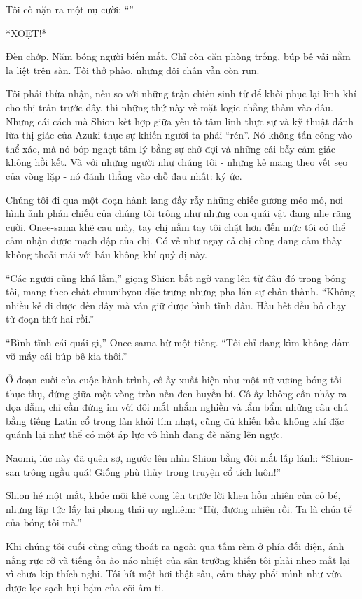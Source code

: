 \documentclass[../main.tex]{subfiles}
\begin{document}
Tôi cố nặn ra một nụ cười: ``''

*XOẸT!*

Đèn chớp. Năm bóng người biến mất. Chỉ còn căn phòng trống, búp bê vải nằm la liệt trên sàn. Tôi thở phào, nhưng đôi chân vẫn còn run.

Tôi phải thừa nhận, nếu so với những trận chiến sinh tử để khôi phục lại linh khí cho thị trấn trước đây, thì những thứ này về mặt logic chẳng thấm vào đâu. Nhưng cái cách mà Shion kết hợp giữa yếu tố tâm linh thực sự và kỹ thuật đánh lừa thị giác của Azuki thực sự khiến người ta phải ``rén''. Nó không tấn công vào thể xác, mà nó bóp nghẹt tâm lý bằng sự chờ đợi và những cái bẫy cảm giác không hồi kết. Và với những người như chúng tôi - những kẻ mang theo vết sẹo của vòng lặp - nó đánh thẳng vào chỗ đau nhất: ký ức.

Chúng tôi đi qua một đoạn hành lang đầy rẫy những chiếc gương méo mó, nơi hình ảnh phản chiếu của chúng tôi trông như những con quái vật đang nhe răng cười. Onee-sama khẽ cau mày, tay chị nắm tay tôi chặt hơn đến mức tôi có thể cảm nhận được mạch đập của chị. Có vẻ như ngay cả chị cũng đang cảm thấy không thoải mái với bầu không khí quỷ dị này.

``Các ngươi cũng khá lắm,'' giọng Shion bất ngờ vang lên từ đâu đó trong bóng tối, mang theo chất chuunibyou đặc trưng nhưng pha lẫn sự chân thành. ``Không nhiều kẻ đi được đến đây mà vẫn giữ được bình tĩnh đâu. Hầu hết đều bỏ chạy từ đoạn thứ hai rồi.''

``Bình tĩnh cái quái gì,'' Onee-sama hừ một tiếng. ``Tôi chỉ đang kìm không đấm vỡ mấy cái búp bê kia thôi.''

Ở đoạn cuối của cuộc hành trình, cô ấy xuất hiện như một nữ vương bóng tối thực thụ, đứng giữa một vòng tròn nến đen huyền bí. Cô ấy không cần nhảy ra dọa dẫm, chỉ cần đứng im với đôi mắt nhắm nghiền và lẩm bẩm những câu chú bằng tiếng Latin cổ trong làn khói tím nhạt, cũng đủ khiến bầu không khí đặc quánh lại như thể có một áp lực vô hình đang đè nặng lên ngực.

Naomi, lúc này đã quên sợ, ngước lên nhìn Shion bằng đôi mắt lấp lánh: ``Shion-san trông ngầu quá! Giống phù thủy trong truyện cổ tích luôn!''

Shion hé một mắt, khóe môi khẽ cong lên trước lời khen hồn nhiên của cô bé, nhưng lập tức lấy lại phong thái uy nghiêm: ``Hừ, đương nhiên rồi. Ta là chúa tể của bóng tối mà.''

Khi chúng tôi cuối cùng cũng thoát ra ngoài qua tấm rèm ở phía đối diện, ánh nắng rực rỡ và tiếng ồn ào náo nhiệt của sân trường khiến tôi phải nheo mắt lại vì chưa kịp thích nghi. Tôi hít một hơi thật sâu, cảm thấy phổi mình như vừa được lọc sạch bụi bặm của cõi âm ti.
\end{document}
